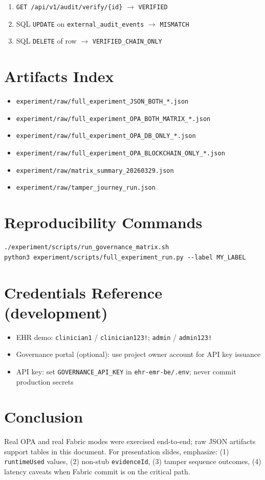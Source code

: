 \documentclass[11pt]{article}
\begin{document}
\begin{enumerate}
  \item \texttt{GET /api/v1/audit/verify/\{id\}} $\rightarrow$ \texttt{VERIFIED}
  \item SQL \texttt{UPDATE} on \texttt{external\_audit\_events} $\rightarrow$ \texttt{MISMATCH}
  \item SQL \texttt{DELETE} of row $\rightarrow$ \texttt{VERIFIED\_CHAIN\_ONLY}
\end{enumerate}

\section{Artifacts Index}
\begin{itemize}
  \item \texttt{experiment/raw/full\_experiment\_JSON\_BOTH\_*.json}
  \item \texttt{experiment/raw/full\_experiment\_OPA\_BOTH\_MATRIX\_*.json}
  \item \texttt{experiment/raw/full\_experiment\_OPA\_DB\_ONLY\_*.json}
  \item \texttt{experiment/raw/full\_experiment\_OPA\_BLOCKCHAIN\_ONLY\_*.json}
  \item \texttt{experiment/raw/matrix\_summary\_20260329.json}
  \item \texttt{experiment/raw/tamper\_journey\_run.json}
\end{itemize}

\section{Reproducibility Commands}
\begin{verbatim}
./experiment/scripts/run_governance_matrix.sh
python3 experiment/scripts/full_experiment_run.py --label MY_LABEL
\end{verbatim}

\section{Credentials Reference (development)}
\begin{itemize}
  \item EHR demo: \texttt{clinician1} / \texttt{clinician123!}; \texttt{admin} / \texttt{admin123!}
  \item Governance portal (optional): use project owner account for API key issuance
  \item API key: set \texttt{GOVERNANCE\_API\_KEY} in \texttt{ehr-emr-be/.env}; never commit production secrets
\end{itemize}

\section{Conclusion}
Real OPA and real Fabric modes were exercised end-to-end; raw JSON artifacts support tables in this document. For presentation slides, emphasize: (1) \texttt{runtimeUsed} values, (2) non-stub \texttt{evidenceId}, (3) tamper sequence outcomes, (4) latency caveats when Fabric commit is on the critical path.
\end{document}
